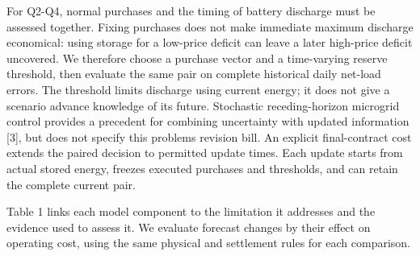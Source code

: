 For Q2-Q4, normal purchases and the timing of battery discharge must be assessed together. Fixing purchases does not make immediate maximum discharge economical: using storage for a low-price deficit can leave a later high-price deficit uncovered. We therefore choose a purchase vector and a time-varying reserve threshold, then evaluate the same pair on complete historical daily net-load errors. The threshold limits discharge using current energy; it does not give a scenario advance knowledge of its future. Stochastic receding-horizon microgrid control provides a precedent for combining uncertainty with updated information {[}3{]}, but does not specify this problem\textquotesingle s revision bill. An explicit final-contract cost extends the paired decision to permitted update times. Each update starts from actual stored energy, freezes executed purchases and thresholds, and can retain the complete current pair.

Table 1 links each model component to the limitation it addresses and the evidence used to assess it. We evaluate forecast changes by their effect on operating cost, using the same physical and settlement rules for each comparison.

\Needspace{201.8pt}
\begingroup
\fontsize{9.0}{10.8}\selectfont
\setlength{\tabcolsep}{3.2pt}
\renewcommand{\arraystretch}{1.12}
\setlength{\LTleft}{0pt plus 1fill}\setlength{\LTright}{0pt plus 1fill}
\setlength{\LTcapwidth}{\linewidth}

